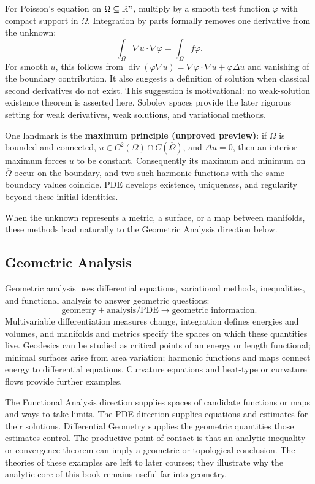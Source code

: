 For Poisson's equation on $\Omega\subseteq\mathbb{R}^n$, multiply by a smooth
test function $\varphi$ with compact support in $\Omega$. Integration by
parts formally removes one derivative from the unknown:
\[
\boxed{\int_\Omega\nabla u\cdot\nabla\varphi
=\int_\Omega f\varphi.}
\]
For smooth $u$, this follows from
$\operatorname{div}(\varphi\nabla u)=\nabla\varphi\cdot\nabla u+
\varphi\Delta u$ and vanishing of the boundary contribution. It also
suggests a definition of solution when classical second derivatives do
not exist. This suggestion is motivational: no weak-solution existence
theorem is asserted here. Sobolev spaces provide the later rigorous setting
for weak derivatives, weak solutions, and variational methods.

One landmark is the \textbf{maximum principle (unproved preview)}:
if $\Omega$ is bounded and connected, $u\in C^2(\Omega)\cap C(\overline\Omega)$,
and $\Delta u=0$, then an interior maximum forces $u$ to be constant.
Consequently its maximum and minimum on $\overline\Omega$ occur on the
boundary, and two such harmonic functions with the same boundary values
coincide. PDE develops existence, uniqueness, and regularity beyond these
initial identities.

When the unknown represents a metric, a surface, or a map between manifolds,
these methods lead naturally to the Geometric Analysis direction below.

\subsection*{Geometric Analysis}

\label{sec:geometric-analysis-preview}
Geometric analysis uses differential equations, variational methods,
inequalities, and functional analysis to answer geometric questions:
\[
\boxed{\text{geometry}+\text{analysis/PDE}\longrightarrow
\text{geometric information}.}
\]
Multivariable differentiation measures change, integration defines energies
and volumes, and manifolds and metrics specify the spaces on which these
quantities live. Geodesics can be studied as critical points of an energy
or length functional; minimal surfaces arise from area variation; harmonic
functions and maps connect energy to differential equations. Curvature
equations and heat-type or curvature flows provide further examples.

The Functional Analysis direction supplies spaces of candidate functions
or maps and ways to take limits. The PDE direction supplies equations and
estimates for their solutions. Differential Geometry supplies the geometric
quantities those estimates control. The productive point of contact is
that an analytic inequality or convergence theorem can imply a geometric
or topological conclusion. The theories of these examples are left to
later courses; they illustrate why the analytic core of this book remains
useful far into geometry.

